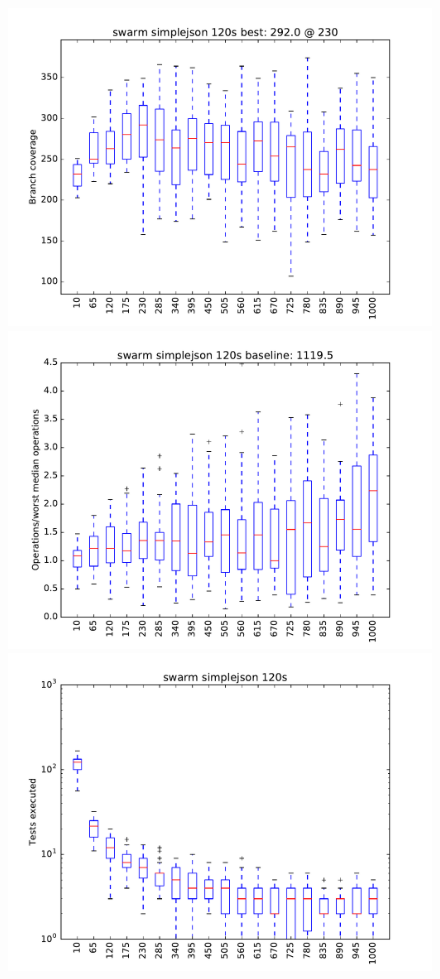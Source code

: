 \begin{figure}
\includegraphics[width=\columnwidth]{graphs/simplejsonswarm120}
\includegraphics[width=\columnwidth]{graphs/opssimplejsonswarm120}
\includegraphics[width=\columnwidth]{graphs/execsimplejsonswarm120}
\end{figure}



